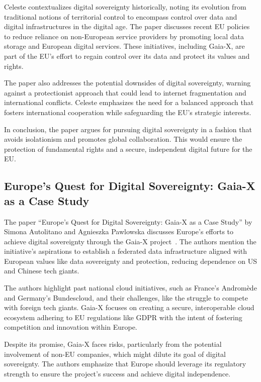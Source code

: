 Celeste contextualizes digital sovereignty historically, noting its evolution from traditional notions of territorial control to encompass control over data and digital infrastructures in the digital age.
The paper discusses recent EU policies to reduce reliance on non-European service providers by promoting local data storage and European digital services.
These initiatives, including Gaia-X, are part of the EU's effort to regain control over its data and protect its values and rights.

The paper also addresses the potential downsides of digital sovereignty, warning against a protectionist approach that could lead to internet fragmentation and international conflicts.
Celeste emphasizes the need for a balanced approach that fosters international cooperation while safeguarding the EU's strategic interests.

In conclusion, the paper argues for pursuing digital sovereignty in a fashion that avoids isolationism and promotes global collaboration.
This would ensure the protection of fundamental rights and a secure, independent digital future for the EU.

\subsection{Europe's Quest for Digital Sovereignty: Gaia-X as a Case Study}\label{subsec:europe's-quest-for-digital-sovereignty:-gaia-x-as-a-case-study}

The paper ``Europe's Quest for Digital Sovereignty: Gaia-X as a Case Study'' by Simona Autolitano and Agnieszka Pawlowska discusses Europe's efforts to achieve digital sovereignty through the Gaia-X project~\cite{europe_quest_for_digital_sovereignty}.
The authors mention the initiative's aspirations to establish a federated data infrastructure aligned with European values like data sovereignty and protection, reducing dependence on US and Chinese tech giants.

The authors highlight past national cloud initiatives, such as France's Andromède and Germany's Bundescloud, and their challenges, like the struggle to compete with foreign tech giants.
Gaia-X focuses on creating a secure, interoperable cloud ecosystem adhering to EU regulations like GDPR with the intent of fostering competition and innovation within Europe.

Despite its promise, Gaia-X faces risks, particularly from the potential involvement of non-EU companies, which might dilute its goal of digital sovereignty.
The authors emphasize that Europe should leverage its regulatory strength to ensure the project's success and achieve digital independence.

